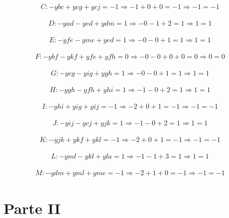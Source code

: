 \documentclass[a4paper]{report}
\begin{document}
\begin{multline}
C: - ybc + ycg + ycj = -1
\Rightarrow - 1 + 0 + 0 = -1
\Rightarrow -1 = -1
\end{multline}

\begin{multline}
D: - yad - yed + ydm = 1
\Rightarrow - 0 - 1 + 2 = 1
\Rightarrow 1 = 1
\end{multline}

\begin{multline}
E: - yfe - yme + yed = 1
\Rightarrow - 0 - 0 + 1 = 1
\Rightarrow 1 = 1
\end{multline}

\begin{multline}
F: - ybf - ykf + yfe + yfh = 0
\Rightarrow - 0 - 0 + 0 + 0 = 0
\Rightarrow 0 = 0
\end{multline}

\begin{multline}
G: - ycg - yig + ygh = 1
\Rightarrow - 0 - 0 + 1 = 1
\Rightarrow 1 = 1
\end{multline}

\begin{multline}
H: - ygh - yfh + yhi = 1
\Rightarrow - 1 - 0 + 2 = 1
\Rightarrow 1 = 1
\end{multline}

\begin{multline}
I: - yhi + yig + yij = -1
\Rightarrow - 2 + 0 + 1 = -1
\Rightarrow -1 = -1
\end{multline}

\begin{multline}
J: - yij - ycj + yjk = 1
\Rightarrow - 1 - 0 + 2 = 1
\Rightarrow 1 = 1
\end{multline}

\begin{multline}
K: - yjk + ykf + ykl = -1
\Rightarrow - 2 + 0 + 1 = -1
\Rightarrow -1 = -1
\end{multline}

\begin{multline}
L: - yml - ykl + yla = 1
\Rightarrow - 1 - 1 + 3 = 1
\Rightarrow 1 = 1
\end{multline}

\begin{multline}
M: - ydm + yml + yme = -1
\Rightarrow - 2 + 1 + 0 = -1
\Rightarrow -1 = -1
\end{multline}


\chapter{Parte II}
\end{document}
